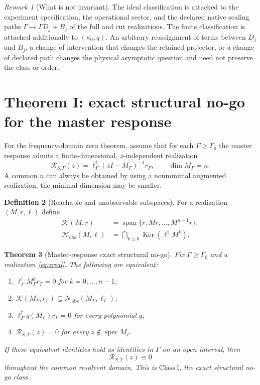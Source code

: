 \documentclass[11pt]{article}
\newtheorem{theorem}{Theorem}[section]
\theoremstyle{definition}
\newtheorem{definition}[theorem]{Definition}
\theoremstyle{remark}
\newtheorem{remark}[theorem]{Remark}
\theoremstyle{plain}
\newcommand{\K}{\mathcal K}
\newcommand{\R}{\mathcal R}
\newcommand{\spec}{\operatorname{spec}}
\newcommand{\Ker}{\operatorname{Ker}}
\newcommand{\Span}{\operatorname{span}}
\newcommand{\ClassI}{\ensuremath{\mathrm{Class\ I}}}
\begin{document}
\begin{remark}[What is not invariant]
The ideal classification is attached to the experiment specification, the
operational sector, and the declared native scaling paths
$\Gamma\mapsto\Gamma D_j+B_j$ of the full and cut realizations.  The finite
classification is attached additionally to $(\kappa_0,q)$.  An arbitrary
reassignment of terms between $D_j$ and $B_j$, a change of intervention that
changes the retained projector, or a change of declared path changes the
physical asymptotic question and need not preserve the class or order.
\end{remark}

\section{Theorem I: exact structural no-go for the master response}

For the frequency-domain zero theorem, assume that for each $\Gamma\ge\Gamma_0$ the master response admits a finite-dimensional, $z$-independent realization
\begin{equation}\label{eq:zreal}
 \R_{S,\Gamma}(z)=\ell_\Gamma^\dagger(zI-M_\Gamma)^{-1}r_\Gamma,
 \qquad \dim M_\Gamma=n.
\end{equation}
A common $n$ can always be obtained by using a nonminimal augmented realization; the minimal dimension may be smaller.

\begin{definition}[Reachable and unobservable subspaces]
For a realization $(M,r,\ell)$ define
\begin{align}
 \K(M,r)&=\Span\{r,Mr,\ldots,M^{n-1}r\},\\
 \mathcal N_{\mathrm{obs}}(M,\ell)
 &=\bigcap_{k\ge0}\Ker(\ell^\dagger M^k).
\end{align}
\end{definition}

\begin{theorem}[Master-response exact structural no-go]\label{thm:exact}
Fix $\Gamma\ge\Gamma_0$ and a realization \eqref{eq:zreal}.  The following are equivalent:
\begin{enumerate}[label=(\roman*)]
 \item $\ell_\Gamma^\dagger M_\Gamma^k r_\Gamma=0$ for $k=0,\ldots,n-1$;
 \item $\K(M_\Gamma,r_\Gamma)\subseteq\mathcal N_{\mathrm{obs}}(M_\Gamma,\ell_\Gamma)$;
 \item $\ell_\Gamma^\dagger q(M_\Gamma)r_\Gamma=0$ for every polynomial $q$;
 \item $\R_{S,\Gamma}(z)=0$ for every $z\notin\spec M_\Gamma$.
\end{enumerate}
If these equivalent identities hold as identities in $\Gamma$ on an open interval, then
\begin{equation}\label{eq:classI}
 \R_{S,\Gamma}(z)\equiv0
\end{equation}
throughout the common resolvent domain.  This is \ClassI, the exact structural no-go class.
\end{theorem}
\end{document}

